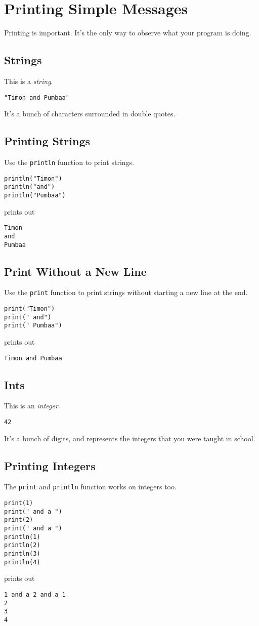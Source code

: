 \documentclass[10pt,oneside]{book}
\begin{document}
\section{Printing Simple Messages}
Printing is important. It's the only way to observe what your program is doing.

\subsection*{Strings}
This is a {\em string}. 
\begin{lstlisting}
"Timon and Pumbaa"
\end{lstlisting}
It's a bunch of characters surrounded in double quotes.

\subsection*{Printing Strings}
Use the \texttt{\frenchspacing println} function to print strings.
\begin{lstlisting}
println("Timon")
println("and")
println("Pumbaa")
\end{lstlisting}
prints out
\begin{lstlisting}
Timon
and
Pumbaa
\end{lstlisting}

\subsection*{Print Without a New Line}
Use the \texttt{\frenchspacing print} function to print strings without starting a new line at the end.
\begin{lstlisting}
print("Timon")
print(" and")
print(" Pumbaa")
\end{lstlisting}
prints out
\begin{lstlisting}
Timon and Pumbaa
\end{lstlisting}

\subsection*{Ints}
This is an {\em integer}.
\begin{lstlisting}
42
\end{lstlisting}
It's a bunch of digits, and represents the integers that you were taught in school.

\subsection*{Printing Integers}
The \texttt{\frenchspacing print} and \texttt{\frenchspacing println} function works on integers too.
\begin{lstlisting}
print(1)
print(" and a ")
print(2)
print(" and a ")
println(1)
println(2)
println(3)
println(4)
\end{lstlisting}
prints out
\begin{lstlisting}
1 and a 2 and a 1
2
3
4
\end{lstlisting}
\end{document}
